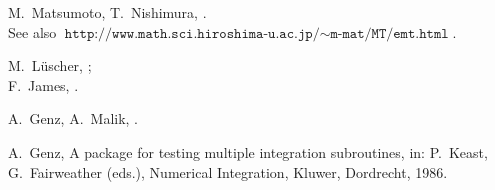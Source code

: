 \documentclass[12pt]{article}
\newcommand\Code[1]{\ensuremath{\texttt{#1}}}
\begin{document}
\begin{thebibliography}{99}
M.~Matsumoto, T.~Nishimura, . \\
See also 
\Code{http://www.math.sci.hiroshima-u.ac.jp/$\sim$m-mat/MT/emt.html}.

M.~L\"uscher, ; \\
F.~James, .

A.~Genz, A.~Malik, .

A.~Genz, A package for testing multiple integration subroutines, in: 
P.~Keast, G.~Fairweather (eds.), Numerical Integration, Kluwer,
Dordrecht, 1986.

\end{thebibliography}
\end{document}
